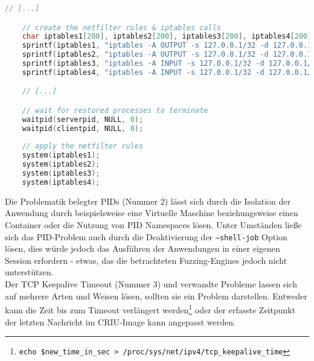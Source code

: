 \documentclass[a4paper]{article}
\begin{document}
\begin{lstlisting}[caption=Setzen der Firewallregeln, language=C]
    // [...]

    // create the netfilter rules & iptables calls
    char iptables1[200], iptables2[200], iptables3[200], iptables4[200];
    sprintf(iptables1, "iptables -A OUTPUT -s 127.0.0.1/32 -d 127.0.0.1/32 -p tcp -m mark ! --mark 0xc114 -m tcp --sport %i --dport %i -j DROP", clientport, serverport);
    sprintf(iptables2, "iptables -A OUTPUT -s 127.0.0.1/32 -d 127.0.0.1/32 -p tcp -m mark ! --mark 0xc114 -m tcp --sport %i --dport %i -j DROP", serverport, clientport);
    sprintf(iptables3, "iptables -A INPUT -s 127.0.0.1/32 -d 127.0.0.1/32 -p tcp -m mark ! --mark 0xc114 -m tcp --sport %i --dport %i -j DROP", clientport, serverport);
    sprintf(iptables4, "iptables -A INPUT -s 127.0.0.1/32 -d 127.0.0.1/32 -p tcp -m mark ! --mark 0xc114 -m tcp --sport %i --dport %i -j DROP", serverport, clientport);

    // [...]

    // wait for restored processes to terminate
    waitpid(serverpid, NULL, 0);
    waitpid(clientpid, NULL, 0);
    
    // apply the netfilter rules
    system(iptables1);
    system(iptables2);
    system(iptables3);
    system(iptables4);
\end{lstlisting}
Die Problematik belegter PIDs (Nummer 2) lässt sich durch die Isolation der Anwendung durch beispielsweise eine Virtuelle Maschine beziehungsweise einen Container oder die Nutzung von PID Namespaces\cite{pidns} lösen. 
Unter Umständen ließe sich das PID-Problem auch durch die Deaktivierung der \texttt{--shell-job} Option lösen, dies würde jedoch das Ausführen der Anwendungen in einer eigenen Session erfordern - etwas, das die betrachteten Fuzzing-Engines jedoch nicht unterstützen.\\
Der TCP Keepalive Timeout (Nummer 3) und verwandte Probleme lassen sich auf mehrere Arten und Weisen lösen, sollten sie ein Problem darstellen. Entweder kann die Zeit bis zum Timeout verlängert werden\footnote{\texttt{echo \$new\_time\_in\_sec > /proc/sys/net/ipv4/tcp\_keepalive\_time}} oder der erfasste Zeitpunkt der letzten Nachricht im CRIU-Image kann angepasst werden.
\end{document}
